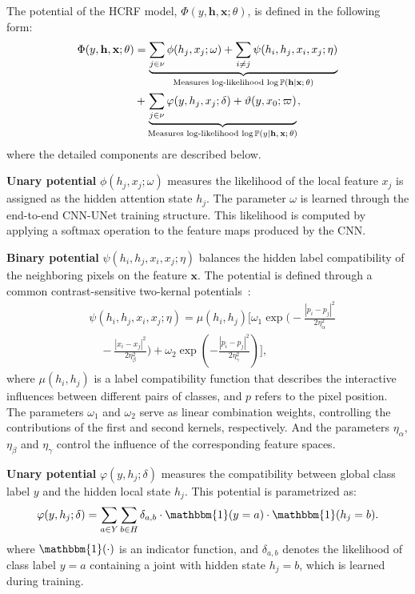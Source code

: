 \documentclass[conference]{IEEEtran}
\newcommand{\hb}{\mathbf{h}}
\newcommand{\PP}{{\mathbb{P}}}
\newcommand{\xb}{\mathbf{x}}
\newcommand{\one}{\mathbbm{1}}
\begin{document}
The potential of the HCRF model, $\Phi(y, \hb, \xb; \theta)$, is defined in the
following form:
\begin{align*}
\Phi(y, \hb, \xb; \theta) &= \underbrace{
\sum_{j \in \nu} \phi(h_j, x_j; \omega) +
\sum_{i \neq j} \psi(h_i, h_j, x_i, x_j; \eta)}_{
\textrm{Measures log-likelihood $\log \PP(\hb \vert \xb; \theta)$}} \\
& + \underbrace{
\sum_{j \in \nu} \varphi(y, h_j, x_j; \delta) + \vartheta(y, x_0; \varpi)}_{
\textrm{Measures log-likelihood $\log \PP(y \vert \hb, \xb; \theta)$}},
\end{align*}
where the detailed components are described below.


\textbf{Unary potential} $\phi(h_j, x_j; \omega)$ measures the likelihood of
the local feature $x_j$ is assigned as the hidden attention state $h_j$.
The parameter $\omega$ is learned through the end-to-end CNN-UNet training
structure. This likelihood is computed by applying a softmax operation to the
feature maps produced by the CNN.


\textbf{Binary potential} $\psi(h_i, h_j, x_i, x_j; \eta)$ balances the
hidden label compatibility of the neighboring pixels on the feature $\xb$.
The potential is defined through a common contrast-sensitive two-kernal
potentials~\citep{krahenbuhl2011efficient, chen2022end}:
\begin{equation*}
\begin{split}
& \psi(h_i, h_j, x_i, x_j; \eta) = \mu(h_i, h_j) \Bigg[
\omega_1 \exp \bigg(
-\frac{\left\lvert p_i - p_j \right\rvert^2}{2\eta_\alpha^2} \\
&\quad
- \frac{\left\lvert x_i - x_j\right\rvert^2}{2\eta_\beta^2}
\bigg) + \omega_2 \exp \left(
- \frac{\left\lvert p_i - p_j \right\rvert^2}{2 \eta_\gamma^2}
\right)
\Bigg],
\end{split}
\end{equation*}
where $\mu(h_i, h_j)$ is a label compatibility function that describes
the interactive influences between different pairs of classes,
and $p$ refers to the pixel position.
The parameters $\omega_1$ and $\omega_2$ serve as linear combination weights,
controlling the contributions of the first and second kernels, respectively.
And the parameters $\eta_\alpha$, $\eta_\beta$ and $\eta_\gamma$ control the
influence of the corresponding feature spaces.


\textbf{Unary potential} $\varphi(y, h_j; \delta)$ measures the compatibility
between global class label $y$ and the hidden local state $h_j$.
This potential is parametrized as:
\begin{equation*}
\varphi(y, h_{j}; \delta) = \sum_{a \in Y} \sum_{b \in H} \delta_{a, b}
\cdot \one(y = a) \cdot \one(h_j = b).
\end{equation*}
where $\one(\cdot)$ is an indicator function, and $\delta_{a,b}$ denotes the
likelihood of class label $y = a$ containing a joint with hidden state
$h_j = b$, which is learned during training.
\end{document}
